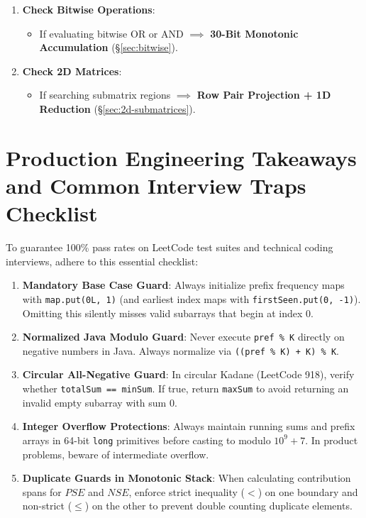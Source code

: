 \documentclass[10pt,journal,compsoc,onecolumn]{IEEEtran}
\begin{document}
\begin{enumerate}
    \item \textbf{Check Bitwise Operations}:
    \begin{itemize}
        \item If evaluating bitwise OR or AND $\implies$ \textbf{30-Bit Monotonic Accumulation} (\S\ref{sec:bitwise}).
    \end{itemize}
    \item \textbf{Check 2D Matrices}:
    \begin{itemize}
        \item If searching submatrix regions $\implies$ \textbf{Row Pair Projection + 1D Reduction} (\S\ref{sec:2d-submatrices}).
    \end{itemize}
\end{enumerate}

\section{Production Engineering Takeaways and Common Interview Traps Checklist}
\label{sec:best_practices}

To guarantee 100\% pass rates on LeetCode test suites and technical coding interviews, adhere to this essential checklist:
\begin{enumerate}
    \item \textbf{Mandatory Base Case Guard}: Always initialize prefix frequency maps with \texttt{map.put(0L, 1)} (and earliest index maps with \texttt{firstSeen.put(0, -1)}). Omitting this silently misses valid subarrays that begin at index $0$.
    \item \textbf{Normalized Java Modulo Guard}: Never execute \texttt{pref \% K} directly on negative numbers in Java. Always normalize via \texttt{((pref \% K) + K) \% K}.
    \item \textbf{Circular All-Negative Guard}: In circular Kadane (LeetCode 918), verify whether \texttt{totalSum == minSum}. If true, return \texttt{maxSum} to avoid returning an invalid empty subarray with sum $0$.
    \item \textbf{Integer Overflow Protections}: Always maintain running sums and prefix arrays in 64-bit \texttt{long} primitives before casting to modulo $10^9+7$. In product problems, beware of intermediate overflow.
    \item \textbf{Duplicate Guards in Monotonic Stack}: When calculating contribution spans for $PSE$ and $NSE$, enforce strict inequality ($<$) on one boundary and non-strict ($\le$) on the other to prevent double counting duplicate elements.
\end{enumerate}
\end{document}
